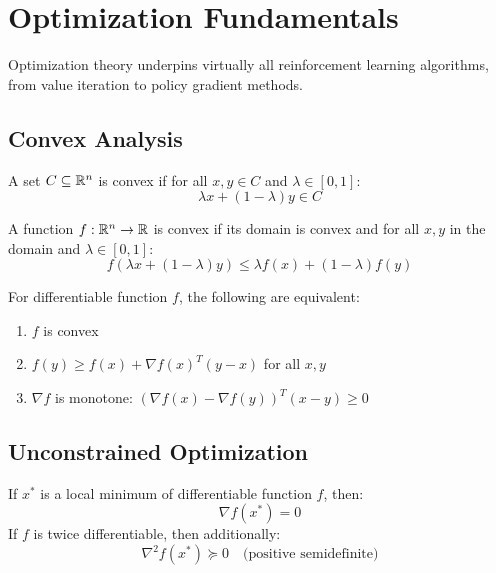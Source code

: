 \section{Optimization Fundamentals}

Optimization theory underpins virtually all reinforcement learning algorithms, from value iteration to policy gradient methods.

\subsection{Convex Analysis}

\begin{definition}
A set $C \subseteq \mathbb{R}^n$ is convex if for all $x, y \in C$ and $\lambda \in [0,1]$:
\begin{equation}
\lambda x + (1-\lambda) y \in C
\end{equation}
\end{definition}

\begin{definition}
A function $f: \mathbb{R}^n \to \mathbb{R}$ is convex if its domain is convex and for all $x, y$ in the domain and $\lambda \in [0,1]$:
\begin{equation}
f(\lambda x + (1-\lambda) y) \leq \lambda f(x) + (1-\lambda) f(y)
\end{equation}
\end{definition}

\begin{theorem}
For differentiable function $f$, the following are equivalent:
\begin{enumerate}
    \item $f$ is convex
    \item $f(y) \geq f(x) + \nabla f(x)^T(y - x)$ for all $x, y$
    \item $\nabla f$ is monotone: $(\nabla f(x) - \nabla f(y))^T(x - y) \geq 0$
\end{enumerate}
\end{theorem}

\subsection{Unconstrained Optimization}

\begin{theorem}
If $x^*$ is a local minimum of differentiable function $f$, then:
\begin{equation}
\nabla f(x^*) = 0
\end{equation}
If $f$ is twice differentiable, then additionally:
\begin{equation}
\nabla^2 f(x^*) \succeq 0 \quad \text{(positive semidefinite)}
\end{equation}
\end{theorem}

